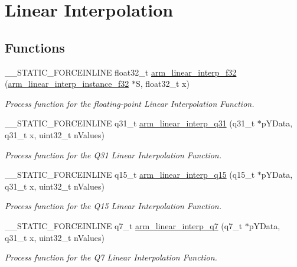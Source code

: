 \hypertarget{group___linear_interpolate}{}\section{Linear Interpolation}
\label{group___linear_interpolate}
\subsection*{Functions}
\begin{DoxyCompactItemize}
\item 
\+\_\+\+\_\+\+S\+T\+A\+T\+I\+C\+\_\+\+F\+O\+R\+C\+E\+I\+N\+L\+I\+NE float32\+\_\+t \mbox{\hyperlink{group___linear_interpolate_ga5335f60532bab8cee1e7c22f76a41805}{arm\+\_\+linear\+\_\+interp\+\_\+f32}} (\mbox{\hyperlink{structarm__linear__interp__instance__f32}{arm\+\_\+linear\+\_\+interp\+\_\+instance\+\_\+f32}} $\ast$S, float32\+\_\+t x)
\begin{DoxyCompactList}\small\item\em Process function for the floating-\/point Linear Interpolation Function. \end{DoxyCompactList}\item 
\+\_\+\+\_\+\+S\+T\+A\+T\+I\+C\+\_\+\+F\+O\+R\+C\+E\+I\+N\+L\+I\+NE q31\+\_\+t \mbox{\hyperlink{group___linear_interpolate_gaeaf31289367ac36c4727939e1ea73312}{arm\+\_\+linear\+\_\+interp\+\_\+q31}} (q31\+\_\+t $\ast$p\+Y\+Data, q31\+\_\+t x, uint32\+\_\+t n\+Values)
\begin{DoxyCompactList}\small\item\em Process function for the Q31 Linear Interpolation Function. \end{DoxyCompactList}\item 
\+\_\+\+\_\+\+S\+T\+A\+T\+I\+C\+\_\+\+F\+O\+R\+C\+E\+I\+N\+L\+I\+NE q15\+\_\+t \mbox{\hyperlink{group___linear_interpolate_ga9a308a0de4d4e4fe4a262a99b17121cd}{arm\+\_\+linear\+\_\+interp\+\_\+q15}} (q15\+\_\+t $\ast$p\+Y\+Data, q31\+\_\+t x, uint32\+\_\+t n\+Values)
\begin{DoxyCompactList}\small\item\em Process function for the Q15 Linear Interpolation Function. \end{DoxyCompactList}\item 
\+\_\+\+\_\+\+S\+T\+A\+T\+I\+C\+\_\+\+F\+O\+R\+C\+E\+I\+N\+L\+I\+NE q7\+\_\+t \mbox{\hyperlink{group___linear_interpolate_gafabd4124a8724055329b5c484419f936}{arm\+\_\+linear\+\_\+interp\+\_\+q7}} (q7\+\_\+t $\ast$p\+Y\+Data, q31\+\_\+t x, uint32\+\_\+t n\+Values)
\begin{DoxyCompactList}\small\item\em Process function for the Q7 Linear Interpolation Function. \end{DoxyCompactList}\end{DoxyCompactItemize}


